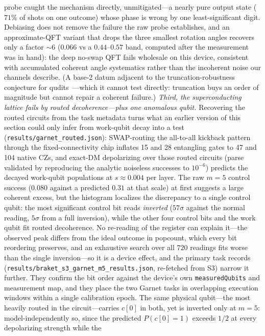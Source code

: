\documentclass[aps,pra,reprint,superscriptaddress,nofootinbib,floatfix]{revtex4-2}
\begin{document}
probe caught the mechanism directly, unmitigated---a
nearly pure output state ($71\%$ of shots on one outcome) whose phase
is wrong by one least-significant digit. Debiasing does not remove
the failure the raw probe establishes, and an approximate-QFT variant that
drops the three smallest rotation angles recovers only a factor
${\sim}6$ ($0.066$ vs a $0.44$--$0.57$ band, computed after the
measurement was in hand): the deep no-swap QFT
fails wholesale on this device, consistent with accumulated coherent
angle systematics rather than the incoherent noise our channels
describe. (A base-2 datum adjacent to the truncation-robustness
conjecture for qudits~\cite{pavlidis2021}---which it cannot test
directly: truncation buys an order of magnitude but cannot repair a
coherent failure.) \emph{Third, the superconducting lattice fails by routed
decoherence---plus one anomalous qubit.} Recovering the routed
circuits from the task metadata turns what an earlier version of this
section could only infer from work-qubit decay into a test
(\texttt{results/garnet\_routed.json}): SWAP-routing the all-to-all
kickback pattern through the fixed-connectivity chip inflates 15 and
28 entangling gates to 47 and 104 native CZs, and exact-DM
depolarizing over those routed circuits (parse validated by
reproducing the analytic noiseless successes to $10^{-6}$) predicts
the decayed work-qubit populations at $s\approx0.004$ per layer. The
raw $m{=}5$ control success ($0.080$ against a predicted $0.31$ at
that scale) at first suggests a large coherent excess, but the
histogram localizes the discrepancy to a single control qubit: the
most significant control bit reads \emph{inverted} ($57\sigma$
against the normal reading, $5\sigma$ from a full inversion), while
the other four control bits and the work qubit fit routed
decoherence. No re-reading of the register can explain it---the
observed peak differs from the ideal outcome in popcount, which
every bit reordering preserves, and an exhaustive search over all
$720$ readings fits worse than the single inversion---so it is a
device effect, and the primary task records
(\texttt{results/braket\_s3\_garnet\_m5\_results.json}, re-fetched
from S3) narrow it further. They confirm the bit order against the
device's own \texttt{measuredQubits} and measurement map, and they
place the two Garnet tasks in overlapping execution windows within a
single calibration epoch. The same physical qubit---the most heavily
routed in the circuit---carries $c[0]$ in both, yet is inverted only
at $m{=}5$: model-independently so, since the predicted
$P(c[0]{=}1)$ exceeds $1/2$ at every depolarizing strength while the
\end{document}

